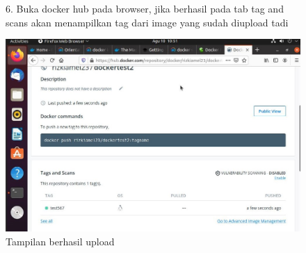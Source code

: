 \begin{figure}
    6. Buka docker hub pada browser, jika berhasil pada tab tag and scans akan menampilkan tag dari image yang sudah diupload tadi
        \begin{center}
            \includegraphics[width=\linewidth]{image/33.jpg}
            \caption{Tampilan berhasil upload}
            \label{fig:my_figure}
        \end{center}
\end{figure}

